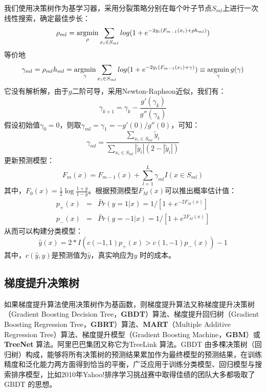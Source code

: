 \begin{enumerate}[（1）]
    我们使用决策树作为基学习器，采用分裂策略分别在每个叶子节点$S_{ml}$上进行一次线性搜索，确定最佳步长：
    \begin{equation}
        \rho_{ml} = \operatorname*{\mathrm{\arg\!\min}}_{\rho} \sum\limits_{x_i\in S_{ml}} log(1+ e^{-2y_i(F_{m-1}(x_i) + \rho h_{ml})} )
    \end{equation}
    等价地
    \begin{equation}
        \gamma_{ml} = \rho_{ml} h_{ml} = \operatorname*{\mathrm{\arg\!\min}}_{\gamma} \sum\limits_{x_i\in S_{ml}} log(1+ e^{-2y_i(F_{m-1}(x_i) + \gamma)}) \equiv \operatorname*{\mathrm{\arg\!\min}}_{\gamma} g(\gamma)
    \end{equation}
    它没有解析解，由于$g$二阶可导，采用Newton-Raphson近似，我们有：
    \begin{equation}
        \gamma_{k+1} = \gamma_k - \frac{g'(\gamma_k)}{g''(\gamma_k)}
    \end{equation}
    假设初始值$\gamma_0=0$，则取$\gamma_{ml} = \gamma_1=-g'(0)/g''(0)$，可知：
    \begin{equation}
        \gamma_{ml} = \frac{\sum\limits_{x_i\in S_{ml}} \tilde{y}_i}{\sum\limits_{x_i\in S_{ml}} |\tilde{y}_i|(2-|\tilde{y}_i|)}
    \end{equation}
    更新预测模型：
    \begin{equation}
        F_m(x) = F_{m-1}(x) + \sum\limits_{l=1}^L \gamma_{ml} I(x\in S_{ml})
    \end{equation}
    其中，$F_0(x)=\frac{1}{2}\log \frac{1+\bar{y}}{1-\bar{y}}$。根据预测模型$F_M(x)$可以推出概率估计值：
    \begin{equation}
        \begin{array}{lll}
          p_{+}(x) & = & \widetilde{Pr}(y=1|x) = 1/[1+e^{-2F_M(x)}] \\
          p_{-}(x) & = & \widetilde{Pr}(y=-1|x) = 1/[1+e^{2F_M(x)}]
        \end{array}
    \end{equation}
    从而可以构建分类模型：
    \begin{equation}
        \hat{y}(x) = 2*I(c(-1,1) p_{+}(x)> c(1,-1)p_{-}(x)) - 1
    \end{equation}
    其中，$c(\hat{y},y)$是预测值为$\hat{y}$，真实响应为$y$ 时的成本。
\end{enumerate}

\subsection{梯度提升决策树}
如果梯度提升算法使用决策树作为基函数，则梯度提升算法又称梯度提升决策树（Gradient Boosting Decision Tree，\textbf{GBDT}）算法、梯度提升回归树（Gradient Boosting Regression Tree，\textbf{GBRT}）算法、\textbf{MART}（Multiple Additive Regression Tree）算法、梯度提升模型（Gradient Boosting Machine，\textbf{GBM}）或\textbf{TreeNet} 算法。阿里巴巴集团又称它为TreeLink 算法。GBDT 由多棵决策树（回归树）构成，能够将所有决策树的预测结果累加作为最终模型的预测结果，在训练精度和泛化能力两方面得到恰当的平衡，广泛应用于训练分类模型、回归模型与搜索排序模型\cite{zheng2007general,burges2010from}，比如2010年Yahoo!排序学习挑战赛中取得佳绩的团队大多都吸取了GBDT 的思想。

